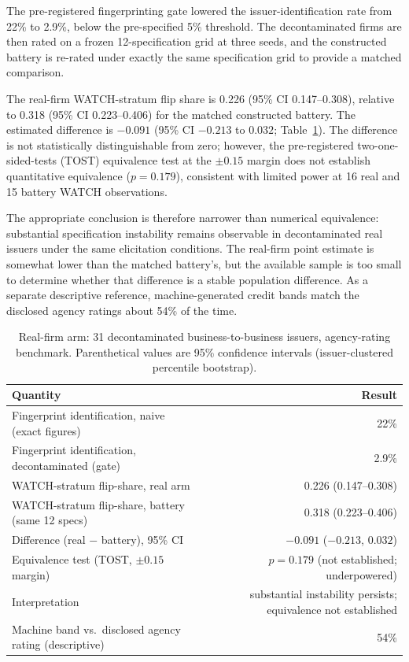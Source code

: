 \documentclass[pdflatex,sn-nature,lineno]{sn-jnl}
\theoremstyle{thmstyleone}
\begin{document}
The pre-registered fingerprinting gate lowered the issuer-identification rate from 22\% to 2.9\%, below
the pre-specified 5\% threshold. The decontaminated firms are then rated on a frozen 12-specification grid
at three seeds, and the constructed battery is re-rated under exactly the same specification grid to
provide a matched comparison.

The real-firm WATCH-stratum flip share is 0.226 (95\% CI 0.147--0.308), relative to 0.318 (95\% CI
0.223--0.406) for the matched constructed battery. The estimated difference is $-0.091$ (95\% CI $-0.213$
to $0.032$; Table~\ref{tab:realarm}). The difference is not statistically distinguishable from zero;
however, the pre-registered two-one-sided-tests (TOST) equivalence test at the $\pm0.15$ margin does not
establish quantitative equivalence ($p=0.179$), consistent with limited power at 16 real and 15 battery
WATCH observations.

The appropriate conclusion is therefore narrower than numerical equivalence: substantial specification
instability remains observable in decontaminated real issuers under the same elicitation conditions. The
real-firm point estimate is somewhat lower than the matched battery's, but the available sample is too
small to determine whether that difference is a stable population difference. As a separate descriptive
reference, machine-generated credit bands match the disclosed agency ratings about 54\% of the time.

\begin{table}[t]\centering
\caption{Real-firm arm: 31 decontaminated business-to-business issuers, agency-rating benchmark.
Parenthetical values are 95\% confidence intervals (issuer-clustered percentile bootstrap).}
\label{tab:realarm}
\begin{tabular}{lr}\toprule
Quantity & Result \\\midrule
Fingerprint identification, naive (exact figures) & 22\% \\
Fingerprint identification, decontaminated (gate) & 2.9\% \\
WATCH-stratum flip-share, real arm & 0.226 (0.147--0.308) \\
WATCH-stratum flip-share, battery (same 12 specs) & 0.318 (0.223--0.406) \\
Difference (real $-$ battery), 95\% CI & $-0.091$ ($-0.213$, $0.032$) \\
Equivalence test (TOST, $\pm0.15$ margin) & $p=0.179$ (not established; underpowered) \\
Interpretation & substantial instability persists; equivalence not established \\
Machine band vs.\ disclosed agency rating (descriptive) & 54\% \\\bottomrule
\end{tabular}\end{table}
\end{document}
